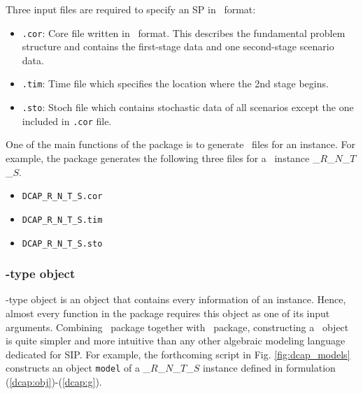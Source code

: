 Three input files are required to specify an SP in \smps\ format:
\begin{itemize}
	\item \texttt{.cor}: Core file written in \mps\ format. This describes the fundamental problem structure and contains the first-stage data and one second-stage scenario data.
	\item \texttt{.tim}: Time file which specifies the location where the 2nd stage begins.
	\item \texttt{.sto}: Stoch file which contains stochastic data of all scenarios except the one included in \texttt{.cor} file.
\end{itemize}
One of the main functions of the package is to generate \smps\ files for an instance. For example, the package generates the following three files for a \dcap\ instance \dcap\_$R$\_$N$\_$T$\_$S$.
\begin{itemize}
	\item \texttt{DCAP\_R\_N\_T\_S.cor}
	\item \texttt{DCAP\_R\_N\_T\_S.tim}
	\item \texttt{DCAP\_R\_N\_T\_S.sto}
\end{itemize}

\subsubsection{\jumpmodel-type object}
\jumpmodel-type object is an object that contains every information of an instance. Hence, almost every function in the package requires this object as one of its input arguments. Combining \structjump\ package together with \jump\ package, constructing a \jumpmodel\ object is quite simpler and more intuitive than any other algebraic modeling language dedicated for SIP. For example, the forthcoming script in Fig. \ref{fig:dcap_models} constructs an object \texttt{model} of a \dcap\_$R$\_$N$\_$T$\_$S$ instance defined in formulation (\ref{dcap:obj})-(\ref{dcap:g}).

